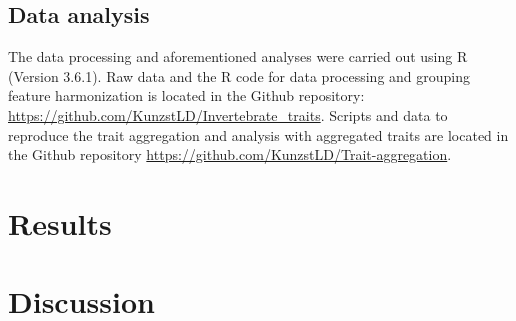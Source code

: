 \documentclass{article}
\begin{document}

\subsection*{Data analysis}

The data processing and aforementioned analyses were carried out using R (Version 3.6.1). Raw data and the R code for data processing and grouping feature harmonization is located in the Github repository: \url{https://github.com/KunzstLD/Invertebrate_traits}. Scripts and data to reproduce the trait aggregation and analysis with aggregated traits are located in the Github repository \url{https://github.com/KunzstLD/Trait-aggregation}.


\newpage
\section*{Results}



\newpage 


\newpage 


\newpage 




\section*{Discussion}
\end{document}
